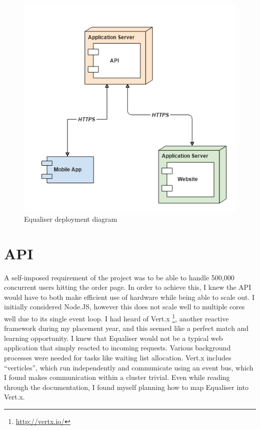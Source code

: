 \documentclass[12pt,a4paper]{bhamdissertation}
\begin{document}
\begin{figure}[ht]
    \centering
    \includegraphics[resolution=120]{img/architecture.png}
    \caption{Equaliser deployment diagram}
\end{figure}

\section{API}

A self-imposed requirement of the project was to be able to handle 500,000 concurrent users hitting the order page. In order to achieve this, I knew the API would have to both make efficient use of hardware while being able to scale out. I initially considered Node.JS, however this does not scale well to multiple cores well due to its single event loop. I had heard of Vert.x \footnote{\url{http://vertx.io/}}, another reactive framework during my placement year, and this seemed like a perfect match and learning opportunity. I knew that Equaliser would not be a typical web application that simply reacted to incoming requests. Various background processes were needed for tasks like waiting list allocation. Vert.x includes ``verticles'', which run independently and communicate using an event bus, which I found makes communication within a cluster trivial. Even while reading through the documentation, I found myself planning how to map Equaliser into Vert.x.
\end{document}
